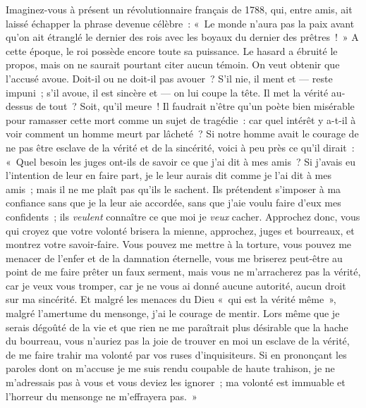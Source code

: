 \documentclass[french,twoside]{book} %
\begin{document}
Imaginez-vous à présent un révolutionnaire français de 1788, qui, entre amis, ait laissé échapper la phrase devenue célèbre : « Le monde n’aura pas la paix avant qu’on ait étranglé le dernier des rois avec les boyaux du dernier des prêtres ! » A cette époque, le roi possède encore toute sa puissance. Le hasard a ébruité le propos, mais on ne saurait pourtant citer aucun témoin. On veut obtenir que l’accusé avoue. Doit-il ou ne doit-il pas avouer ? S’il nie, il ment et — reste impuni ;  s’il avoue, il est sincère et — on lui coupe la tête. Il met la vérité au-dessus de tout ? Soit, qu’il meure ! Il faudrait n’être qu’un poète bien misérable pour ramasser cette mort comme un sujet de tragédie : car quel intérêt y a-t-il à voir comment un homme meurt par lâcheté ? Si notre homme avait le courage de ne pas être esclave de la vérité et de la sincérité, voici à peu près ce qu’il dirait : « Quel besoin les juges ont-ils de savoir ce que j’ai dit à mes amis ? Si j’avais eu l’intention de leur en faire part, je le leur aurais dit comme je l’ai dit à mes amis ; mais il ne me plaît pas qu’ils le sachent. Ils prétendent s’imposer à ma confiance sans que je la leur aie accordée, sans que j’aie voulu faire d’eux mes confidents ; ils \emph{veulent }connaître ce que moi je \emph{veux} cacher. Approchez donc, vous qui croyez que votre volonté brisera la mienne, approchez, juges et bourreaux, et montrez votre savoir-faire. Vous pouvez me mettre à la torture, vous pouvez me menacer de l’enfer et de la damnation éternelle, vous me briserez peut-être au point de me faire prêter un faux serment, mais vous ne m’arracherez pas la vérité, car je veux vous tromper, car je ne vous ai donné aucune autorité, aucun droit sur ma sincérité. Et malgré les menaces du Dieu « qui est la vérité même », malgré l’amertume du mensonge, j’ai le courage de mentir. Lors même que je serais dégoûté de la vie et que rien ne me paraîtrait plus désirable que la hache du bourreau, vous n’auriez pas la joie de trouver en moi un esclave de la vérité, de me faire trahir ma volonté par vos ruses d’inquisiteurs. Si en prononçant les paroles dont on m’accuse je me suis rendu coupable de haute trahison, je ne m’adressais pas à vous et vous deviez les ignorer ; ma volonté est immuable et l’horreur du mensonge ne m’effrayera pas. »\par
\end{document}
